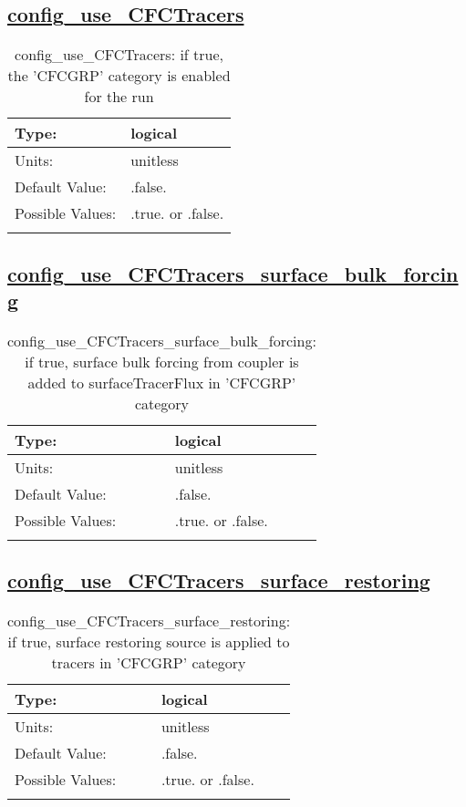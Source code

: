\subsection[config\_use\_CFCTracers]{\hyperref[sec:nm_tab_tracer_forcing_CFCTracers]{config\_use\_CFCTracers}}
\label{subsec:nm_sec_config_use_CFCTracers}
\begin{center}
\begin{longtable}{| p{2.0in} || p{4.0in} |}
    \hline
    Type: & logical \\
    \hline
    Units: & \si{unitless} \\
    \hline
    Default Value: & .false. \\
    \hline
    Possible Values: & .true. or .false. \\
    \hline
    \caption{config\_use\_CFCTracers: if true, the 'CFCGRP' category is enabled for the run}
\end{longtable}
\end{center}
\subsection[config\_use\_CFCTracers\_surface\_bulk\_forcing]{\hyperref[sec:nm_tab_tracer_forcing_CFCTracers]{config\_use\_CFCTracers\_surface\_bulk\_forcing}}
\label{subsec:nm_sec_config_use_CFCTracers_surface_bulk_forcing}
\begin{center}
\begin{longtable}{| p{2.0in} || p{4.0in} |}
    \hline
    Type: & logical \\
    \hline
    Units: & \si{unitless} \\
    \hline
    Default Value: & .false. \\
    \hline
    Possible Values: & .true. or .false. \\
    \hline
    \caption{config\_use\_CFCTracers\_surface\_bulk\_forcing: if true, surface bulk forcing from coupler is added to surfaceTracerFlux in 'CFCGRP' category}
\end{longtable}
\end{center}
\subsection[config\_use\_CFCTracers\_surface\_restoring]{\hyperref[sec:nm_tab_tracer_forcing_CFCTracers]{config\_use\_CFCTracers\_surface\_restoring}}
\label{subsec:nm_sec_config_use_CFCTracers_surface_restoring}
\begin{center}
\begin{longtable}{| p{2.0in} || p{4.0in} |}
    \hline
    Type: & logical \\
    \hline
    Units: & \si{unitless} \\
    \hline
    Default Value: & .false. \\
    \hline
    Possible Values: & .true. or .false. \\
    \hline
    \caption{config\_use\_CFCTracers\_surface\_restoring: if true, surface restoring source is applied to tracers in 'CFCGRP' category}
\end{longtable}
\end{center}
